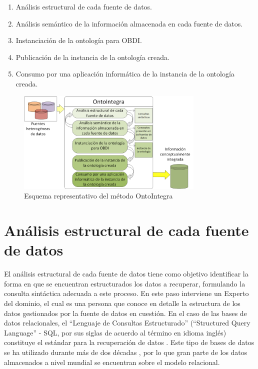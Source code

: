 \begin{enumerate}
\item Análisis estructural de cada fuente de datos.
\item Análisis semántico de la información almacenada en cada fuente de datos.
\item Instanciación de la ontología para OBDI.
\item Publicación de la instancia de la ontología creada.
\item Consumo por una aplicación informática de la instancia de la ontología creada.
\end{enumerate}

\begin{figure}
\begin{center}
	\includegraphics[width=0.8\textwidth]{img/Metodo_OntoIntegra.png}
\end{center}
\caption{Esquema representativo del método OntoIntegra}
\label{fig: metodoOntoIntegra}
\end{figure}

\section{Análisis estructural de cada fuente de datos}

El análisis estructural de cada fuente de datos tiene como objetivo identificar la forma en que se encuentran estructurados los datos a recuperar, formulando la consulta sintáctica adecuada a este proceso. En este paso interviene un Experto del dominio, el cual es una persona que conoce en detalle la estructura de los datos gestionados por la fuente de datos en cuestión. En el caso de las bases de datos relacionales, el ``Lenguaje de Consultas Estructurado'' (``Structured Query Language'' - SQL, por sus siglas de acuerdo al término en idioma inglés) constituye el estándar para la recuperación de datos \citep{Eisenberg:1999:SFK:309844.310075}. Este tipo de bases de datos se ha utilizado durante más de dos décadas \citep{BUCKLES1993660,Hristidis2002670,10.1007/978-981-10-8276-4_22}, por lo que gran parte de los datos almacenados a nivel mundial se encuentran sobre el modelo relacional.

